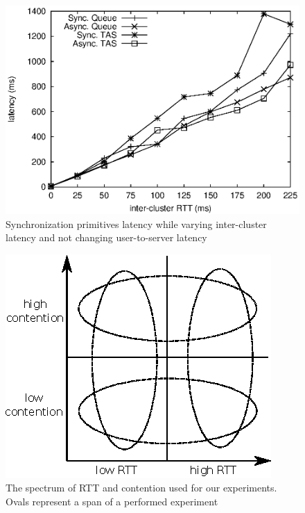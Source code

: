 \begin{figure}[ht]
\centering
\includegraphics[scale=0.68]{img/primitives_fixUserLatency-0.eps}
\caption{Synchronization primitives latency while varying inter-cluster latency and not changing user-to-server latency}
\label{fig:primitives_vary_intercluster}
\end{figure}

\begin{figure}[ht]
\centering
\includegraphics[scale=1.55]{img/spectrum.eps}
\caption{The spectrum of RTT and contention used for our experiments. Ovals represent a span of a performed experiment}
\label{fig:spectrum}
\end{figure}

